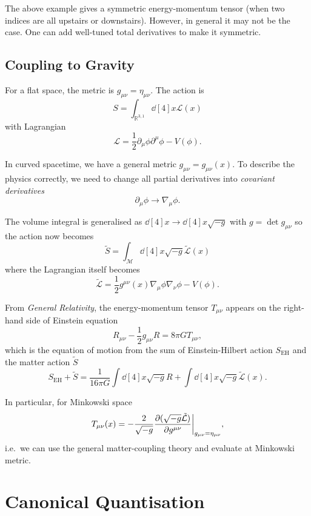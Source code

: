\documentclass[a4paper,11pt]{article}
\begin{document}
	\begin{nt}
		The above example gives a symmetric energy-momentum tensor (when two indices are all upstairs or downstairs). However, in general it may not be the case. One can add well-tuned total derivatives to make it symmetric.
	\end{nt}

	\subsection{Coupling to Gravity}

	For a flat space, the metric is $g _{\mu \nu} = \eta _{\mu \nu}$. The action is
	\[
		S = \int _{\mathbb{R}^{3,1}} \dd[4]{x} \mathcal{L}(x)
	\]
	with Lagrangian
	\[
		\mathcal{L} = \frac{1}{2} \partial_\mu \phi \partial^\mu \phi - V(\phi).
	\]
	
	In curved spacetime, we have a general metric $g _{\mu \nu} = g _{\mu \nu}(x)$. To describe the physics correctly, we need to change all partial derivatives into \emph{covariant derivatives}
	\[
		\partial_\mu \phi \to \nabla_\mu \phi.
	\]
	
	The volume integral is generalised as $\dd[4]{x} \to \dd[4]{x} \sqrt{-g}$ with $g = \det g _{\mu \nu}$ so the action now becomes
	\[
		\tilde{S} = \int _{\mathcal{M}} \dd[4]{x} \sqrt{-g} \tilde{\mathcal{L}} (x)
	\]
	where the Lagrangian itself becomes
	\[
		\tilde{\mathcal{L}} = \frac{1}{2} g ^{\mu \nu}(x) \nabla_\mu \phi \nabla_\nu \phi - V(\phi).
	\]

	From \emph{General Relativity}, the energy-momentum tensor $T _{\mu \nu}$ appears on the right-hand side of Einstein equation
	\[
		R _{\mu \nu} - \frac{1}{2} g _{\mu \nu} R = 8 \pi G T _{\mu \nu},
	\]
	which is the equation of motion from the sum of Einstein-Hilbert action $S _{\text{EH}}$ and the matter action $\tilde{S}$
	\[
		S _{\text{EH}} + \tilde{S}= \frac{1}{16 \pi G} \int \dd[4]{x} \sqrt{-g} R + \int \dd[4]{x} \sqrt{-g} \tilde{\mathcal{L}} (x).
	\]

	In particular, for Minkowski space
	\[
		T _{\mu \nu}(x) = - \frac{2}{\sqrt{-g}} \pdv{(\sqrt{-g} \tilde{\mathcal{L}})}{g ^{\mu\nu}}\bigg|_{g_{\mu \nu} = \eta_{\mu \nu}},
	\]
	i.e.\ we can use the general matter-coupling theory and evaluate at Minkowski metric.

	\newpage

	\section{Canonical Quantisation}
\end{document}

